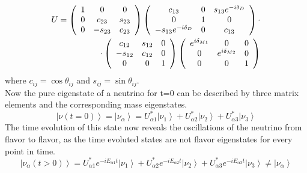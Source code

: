     \begin{equation}
	\centering
	\begin{split}
     U = \left(
	\begin{array}{ccc}
      	1 & 0 & 0\\
      	0 & c_{23} & s_{23}\\
      	0 & -s_{23} & c_{23}\\
   	\end{array}
	\right)
	\left(
	\begin{array}{ccc}
      	c_{13} & 0 & s_{13}e^{-i\delta_D}\\
      	0 & 1 & 0\\
      	-s_{13}e^{-i\delta_D} & 0 & c_{13}\\
      	\end{array}
	\right)\cdot\\
	\cdot\left(
	\begin{array}{ccc}
      	c_{12} & s_{12} & 0\\
      	-s_{12} & c_{12} & 0\\
      	0 & 0 & 1\\
      	\end{array}
	\right)
		\left(
	\begin{array}{ccc}
      	e^{i\delta_{M1}} & 0 & 0\\
      	0 & e^{i\delta_{M2}} & 0\\
      	0 & 0 & 1\\
      	\end{array}
	\right)
	\end{split}
    \end{equation}
    where $c_{ij}=\cos{\theta_{ij}}$ and $s_{ij}=\sin{\theta_{ij}}$.\\
	Now the pure eigenstate of a neutrino for t=0 can be described by three matrix elements and the corresponding mass eigenstates.
	\begin{equation}
		\left|\nu(t=0)\right> = \left|\nu_\alpha\right> = U^*_{\alpha1} \left|\nu_1\right> + U^*_{\alpha2} \left|\nu_2\right> + U^*_{\alpha3} \left|\nu_3\right> 
	\end{equation}
	The time evolution of this state now reveals the oscillations of the neutrino from flavor to flavor, as the time evoluted states are not flavor eigenstates for every point in time. 
	\begin{equation}
		\left|\nu_\alpha(t>0)\right> = U^*_{\alpha1} e^{-iE_{\alpha1}t}\left|\nu_1\right> + U^*_{\alpha2} e^{-iE_{\alpha2}t}\left|\nu_2\right> + U^*_{\alpha3}e^{-iE_{\alpha3}t} \left|\nu_3\right> \neq \left|\nu_\alpha\right> 
	\end{equation}
